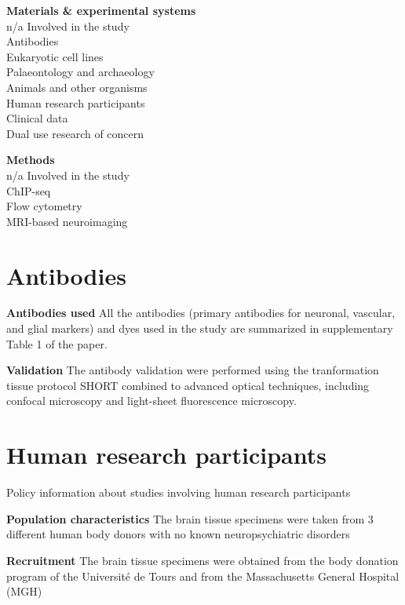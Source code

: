 \documentclass{article}
\begin{document}
\noindent \textbf{Materials \& experimental systems}\\
n/a Involved in the study\\
Antibodies\\
Eukaryotic cell lines\\
Palaeontology and archaeology\\
Animals and other organisms\\
Human research participants\\
Clinical data\\
Dual use research of concern

\noindent \textbf{Methods}\\
n/a Involved in the study\\
ChIP-seq\\
Flow cytometry\\
MRI-based neuroimaging

\section*{Antibodies}

\noindent \textbf{Antibodies used} All the antibodies (primary antibodies for neuronal, vascular, and glial markers) and dyes used in the study are summarized in supplementary Table 1 of the paper.

\noindent \textbf{Validation} The antibody validation were performed using the tranformation tissue protocol SHORT combined to advanced optical techniques, including confocal microscopy and light-sheet fluorescence microscopy.

\section*{Human research participants}

\noindent Policy information about studies involving human research participants

\noindent \textbf{Population characteristics} The brain tissue specimens were taken from 3 different human body donors with no known neuropsychiatric disorders

\noindent \textbf{Recruitment} The brain tissue specimens were obtained from the body donation program of the Université de Tours and from the Massachusetts General Hospital (MGH)
\end{document}
